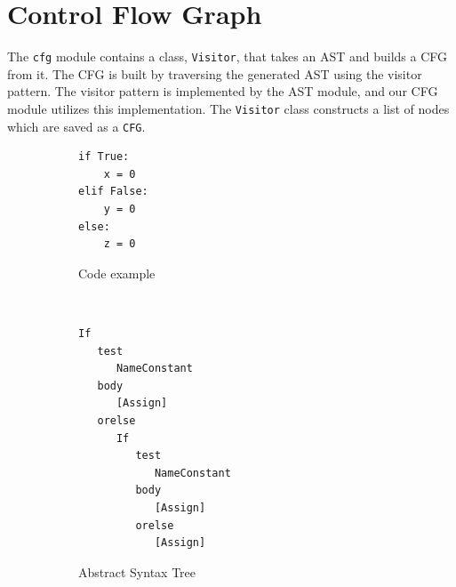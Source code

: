 \section{Control Flow Graph}
The \texttt{cfg} module contains a class, \texttt{Visitor}, that takes an AST and builds a CFG from it.
The CFG is built by traversing the generated AST using the visitor pattern.\cite{design_patterns}
The visitor pattern is implemented by the AST module, and our CFG module utilizes this implementation.
The \texttt{Visitor} class constructs a list of nodes which are saved as a \texttt{CFG}.

\begin{figure}[H]
  \begin{subfigure}[b]{0.2\textwidth}
    \begin{lstlisting}[style=python]
if True:
    x = 0
elif False:
    y = 0
else:
    z = 0
    \end{lstlisting}
    \caption{Code example}
    \label{CFG_if_code}
  \end{subfigure}
  ~~~ %
  \begin{subfigure}[b]{0.4\textwidth}
    \begin{lstlisting}[style=default, basicstyle=\footnotesize, numbers=none]
If
   test
      NameConstant
   body
      [Assign]
   orelse
      If
         test
            NameConstant
         body
            [Assign]
         orelse
            [Assign]
    \end{lstlisting}
    \caption{Abstract Syntax Tree}
    \label{CFG_if_ast}
  \end{subfigure}
  ~
  \begin{subfigure}[b]{0.3\textwidth}
    \centering

\end{subfigure}
\end{figure}
